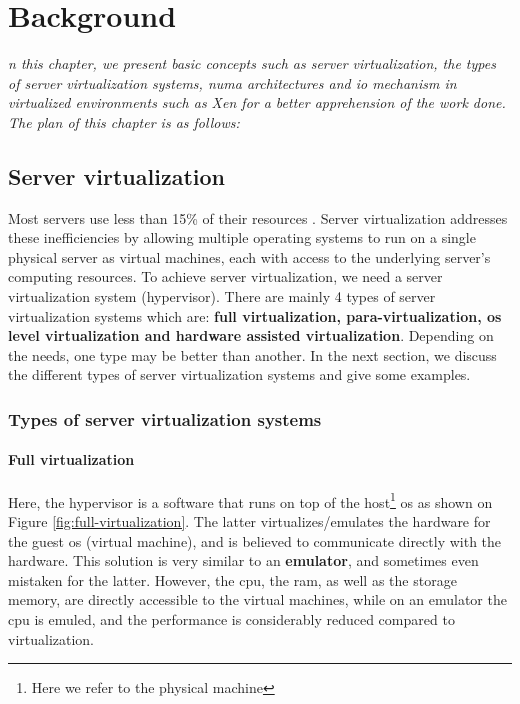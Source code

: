 \let\textcircled=\pgftextcircled
\chapter{Background}
\label{chap:background}

\textit{n this chapter, we present basic concepts such as server virtualization, the types of server virtualization systems, \acrshort{numa} architectures and \acrshort{io} mechanism in virtualized environments such as Xen for a better apprehension of the work done. The plan of this chapter is as follows: }

\minitoc

\newpage    
\section{Server virtualization}
Most servers use less than 15\% of their resources \citep{serv1}. Server virtualization addresses these inefficiencies by allowing multiple operating systems to run on a single physical server as virtual machines, each with access to the underlying server's computing resources. To achieve server virtualization, we need a server virtualization system (hypervisor). There are mainly 4 types of server virtualization systems which are: \textbf{full virtualization, para-virtualization, \acrshort{os} level virtualization and hardware assisted virtualization}. Depending on the needs, one type may be better than another. In the next section, we discuss the different types of server virtualization systems and give some examples.

\subsection{Types of server virtualization systems}
\subsubsection{Full virtualization}
Here, the hypervisor is a software that runs on top of the host\footnote{Here we refer to the physical machine} \acrshort{os} as shown on Figure \ref{fig:full-virtualization}. The latter virtualizes/emulates the hardware for the guest \acrshort{os} (virtual machine), and is believed to communicate directly with the hardware. This solution is very similar to an \textbf{emulator}, and sometimes even mistaken for the latter. However, the \acrshort{cpu}, the \acrshort{ram}, as well as the storage memory, are directly accessible to the virtual machines, while on an emulator the \acrshort{cpu} is emuled, and the performance is considerably reduced compared to virtualization.
